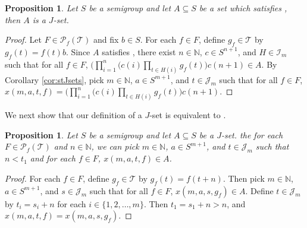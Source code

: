 \documentclass[12pt]{article}
\theoremstyle{plain}
\newtheorem{prop}[thm]{Proposition}
\theoremstyle{definition}
\newcommand{\bbN}{\mathbb{N}}
\newcommand{\calI}{\mathcal{I}}
\newcommand{\calJ}{\mathcal{J}}
\newcommand{\calT}{\mathcal{T}}
\newcommand{\Pf}{\mathcal{P}_f}
\begin{document}
\begin{prop}
  Let $S$ be a semigroup and let $A \subseteq S$ be a set which
  satisfies \cite[Definition 2.3(d)]{Hindman:2010fk}, then $A$ is a $J$-set.
\end{prop}
\begin{proof}
  Let $F \in \Pf(\calT)$ and fix $b \in S$. 
  For each $f \in F$, define $g_f \in \calT$ by $g_f(t) = f(t)b$. 
  Since $A$ satisfies \cite[Definition 2.3(d)]{Hindman:2010fk}, there
  exist $n \in \bbN$, $c \in S^{n+1}$, and $H \in \calI_m$ such that
  for all $f \in F$, $\bigl(\prod_{i=1}^n( c(i) \prod_{t \in H(i)}
  g_f(t)\bigr) c(n+1) \in A$.
  By Corollary \ref{cor:stJsets}, pick $m \in \bbN$, $a \in S^{m+1}$,
  and $t \in \calJ_m$ such that for all $f \in F$, $x(m, a, t, f) =
  \bigl(\prod_{i=1}^n( c(i) \prod_{t \in H(i)} g_f(t)\bigr) c(n+1)$.
\end{proof}

We next show that our definition of a $J$-set is equivalent to
\cite[Definition 3.3(e)]{De:2008uq}.

\begin{prop}
  Let $S$ be a semigroup and let $A \subseteq S$ be a $J$-set. 
  the for each $F \in \Pf(\calT)$ and $n \in \bbN$, we can pick $m \in
  \bbN$, $a \in S^{m+1}$, and $t \in \calJ_m$ such that $n < t_1$ and
  for each $f \in F$, $x(m, a, t, f) \in A$.
\end{prop}
\begin{proof}
  For each $f \in F$, define $g_f \in \calT$ by $g_f(t) = f(t + n)$. 
  Then pick $m \in \bbN$, $a \in S^{m+1}$, and $s \in \calJ_m$ such
  that for all $f \in F$, $x(m, a, s, g_f) \in A$. 
  Define $t \in \calJ_m$ by $t_i = s_i + n$ for each $i \in \{1, 2,
  \ldots, m\}$. 
  Then $t_1 = s_1 + n > n$, and $x(m, a, t, f) = x(m, a, s, g_f)$. 
\end{proof}
\end{document}
